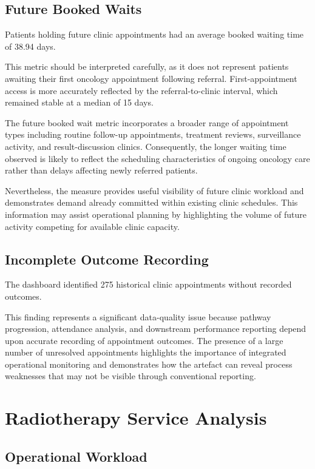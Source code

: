 \subsection{Future Booked Waits}
Patients holding future clinic appointments had an average booked waiting time of 38.94 days. 

This metric should be interpreted carefully, as it does not represent patients awaiting their first oncology appointment following referral. First-appointment access is more accurately reflected by the referral-to-clinic interval, which remained stable at a median of 15 days. 

The future booked wait metric incorporates a broader range of appointment types including routine follow-up appointments, treatment reviews, surveillance activity, and result-discussion clinics. Consequently, the longer waiting time observed is likely to reflect the scheduling characteristics of ongoing oncology care rather than delays affecting newly referred patients. 

Nevertheless, the measure provides useful visibility of future clinic workload and demonstrates demand already committed within existing clinic schedules. This information may assist operational planning by highlighting the volume of future activity competing for available clinic capacity.

\subsection{Incomplete Outcome Recording}
The dashboard identified 275 historical clinic appointments without recorded outcomes. 

This finding represents a significant data-quality issue because pathway progression, attendance analysis, and downstream performance reporting depend upon accurate recording of appointment outcomes. The presence of a large number of unresolved appointments highlights the importance of integrated operational monitoring and demonstrates how the artefact can reveal process weaknesses that may not be visible through conventional reporting. 

\section{Radiotherapy Service Analysis}


\subsection{Operational Workload}

